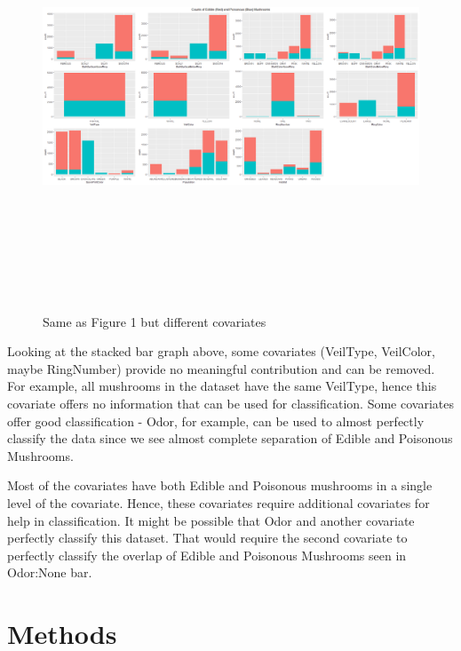\documentclass[float=false, crop=false]{standalone}
\begin{document}
\begin{figure}[H] 
		\includegraphics[width=\textwidth, height=5in]{images/stackedbar2.png}
		\caption{Same as Figure 1 but different covariates}
		\label{fig: sbar2}
\end{figure}

Looking at the stacked bar graph above, some covariates (VeilType, VeilColor, maybe RingNumber) provide no meaningful contribution and can be removed. For example, all mushrooms in the dataset have the same VeilType, hence this covariate offers no information that can be used for classification. Some covariates offer good classification - Odor, for example, can be used to almost perfectly classify the data since we see almost complete separation of Edible and Poisonous Mushrooms. 

Most of the covariates have both Edible and Poisonous mushrooms in a single level of the covariate. Hence, these covariates require additional covariates for help in classification. It might be possible that Odor and another covariate perfectly classify this dataset. That would require the second covariate to perfectly classify the overlap of Edible and Poisonous Mushrooms seen in Odor:None bar. 

\section*{Methods}
\end{document}
